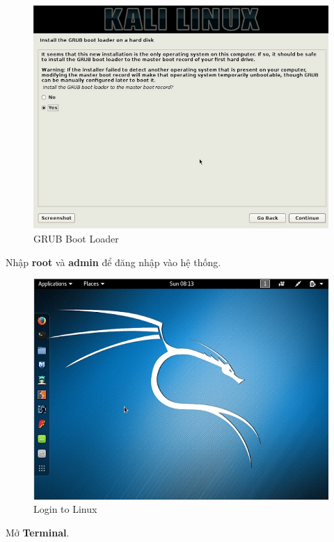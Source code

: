 \begin{figure}[!htb]
    \centering
    \includegraphics[width=0.85\linewidth]{figure//chapter5//lab5_1/GRUB.png}
    \caption{GRUB Boot Loader}
    \label{fig:enter-label}
\end{figure}

 Nhập \textbf{root} và \textbf{admin} để đăng nhập vào hệ thống.

\begin{figure}[!htb]
    \centering
    \includegraphics[width=0.85\linewidth]{figure//chapter5//lab5_1/login.png}
    \caption{Login to Linux}
    \label{fig:enter-label}
\end{figure}

 Mở \textbf{Terminal}.

